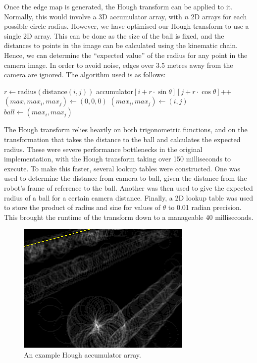 \documentclass[pdftex,11pt,a4paper]{report}
\begin{document}
Once the edge map is generated, the Hough transform can be applied to it.
Normally, this would involve a 3D accumulator array, with $n$ 2D arrays for
each possible circle radius. However, we have optimised our Hough transform
to use a single 2D array. This can be done as the size of the ball is
fixed, and the distances to points in the image can be calculated using the
kinematic chain. Hence, we can determine the ``expected value'' of the
radius for any point in the camera image. In order to avoid noise, edges
over 3.5 metres away from the camera are ignored. The algorithm used is as follows:
\begin{algorithmic}
    \STATE $r \gets \mathrm{radius}(\mathrm{distance}(i, j))$
    \STATE accumulator$[i + r\cdot\sin \theta][j + r\cdot\cos \theta]$++
    \ENDFOR
    \ENDIF
    \ENDIF
    \ENDFOR 
    \STATE $(max, max_i, max_j) \gets (0, 0, 0)$
    \STATE $(max_i, max_j) \gets (i, j)$
    \ENDIF
    \ENDFOR
    \STATE $ball \gets (max_i, max_j)$
\end{algorithmic}

The Hough transform relies heavily on both trigonometric functions, and on
the transformation that takes the distance to the ball and calculates the
expected radius. These were severe performance bottlenecks in the original
implementation, with the Hough transform taking over 150 milliseconds to
execute. To make this faster, several lookup tables were constructed. One
was used to determine the distance from camera to ball, given the distance
from the robot's frame of reference to the ball. Another was then used to
give the expected radius of a ball for a certain camera distance. Finally,
a 2D lookup table was used to store the product of radius and sine for
values of $\theta$ to 0.01 radian precision. This brought the runtime of
the transform down to a manageable 40 milliseconds.

\begin{figure}[ht]
    \begin{center}
        \includegraphics{figures/bwHough}
    \end{center}
    \caption{An example Hough accumulator array.}
    \label{fig:bwHough}
\end{figure}
\end{document}
